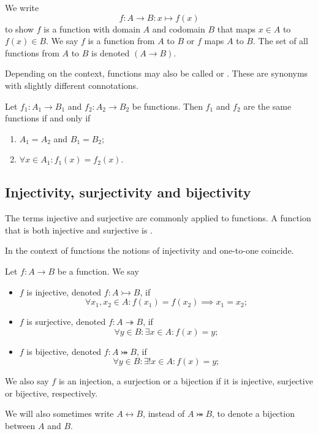 \begin{note}
We write
\[f:A \to B: x\mapsto f(x) \]
to show $f$ is a function with domain $A$ and codomain $B$ that maps $x\in A$ to $f(x)\in B$. We say $f$ is a function from $A$ to $B$ or $f$ maps $A$ to $B$. The set of all functions from $A$ to $B$ is denoted $(A\to B)$.
\end{note}

Depending on the context, functions may also be called  or . These are synonyms with slightly different connotations.

\begin{lemma}
Let $f_1: A_1\to B_1$ and $f_2: A_2\to B_2$ be functions. Then $f_1$ and $f_2$ are the same functions \textup{if and only if}
\begin{enumerate}
\item $A_1 = A_2$ and $B_1 = B_2$;
\item $\forall x\in A_1: f_1(x) = f_2(x)$.
\end{enumerate}
\end{lemma}

\subsection{Injectivity, surjectivity and bijectivity}
\begin{definition}
The terms injective and surjective are commonly applied to functions. A function that is both injective and surjective is .
\end{definition}
In the context of functions the notions of injectivity and one-to-one coincide.
\begin{lemma}
Let $f:A\to B$ be a function. We say
\begin{itemize}
\item $f$ is injective, denoted $f: A\rightarrowtail B$, if
\[ \forall x_1,x_2\in A: f(x_1) = f(x_2) \implies x_1 = x_2; \]
\item $f$ is surjective, denoted $f: A\twoheadrightarrow B$, if
\[ \forall y\in B: \exists x\in A: f(x) = y; \]
\item $f$ is bijective, denoted $f: A\twoheadrightarrowtail B$, if
\[ \forall y\in B: \exists! x\in A: f(x) = y; \]
\end{itemize}
We also say $f$ is an injection, a surjection or a bijection if it is injective, surjective or bijective, respectively.

We will also sometimes write $A \leftrightarrow B$, instead of $A\twoheadrightarrowtail B$, to denote a bijection between $A$ and $B$.
\end{lemma}

